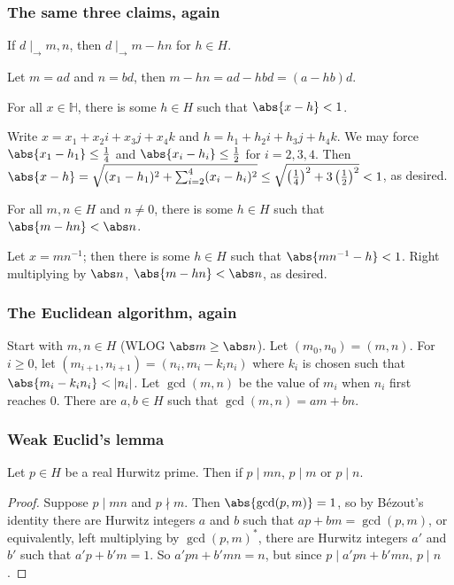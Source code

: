 \documentclass{beamer}
\newcommand{\HH}{\mathbb H}
\newcommand{\rdiv}{\mid_\rightarrow}
\begin{document}
\begin{frame}
	\frametitle{The same three claims, again}
	\begin{block}{}
		If $d \rdiv m,n$, then $d \rdiv m - hn$ for $h \in H$.
	\end{block}
	Let $m = ad$ and $n = bd$, then $m - hn = ad - hbd = (a - hb)d$.

	\begin{block}{}
		For all $x \in \HH$, there is some $h \in H$ such that $\abs{x - h} < 1$.
	\end{block}
	Write $x = x_1 + x_2i + x_3j + x_4k$ and $h = h_1 + h_2i + h_3j + h_4k$. We may force $\abs{x_1 - h_1} \le \frac14$ and $\abs{x_i - h_i} \le \frac12$ for $i = 2,3,4$. Then $\abs{x - h} = \sqrt{(x_1 - h_1)^2 + \sum_{i = 2}^4(x_i - h_i)^2} \le \sqrt{\left(\frac14\right)^2 + 3\left(\frac12\right)^2} < 1$, as desired.
	
	\begin{block}{}
		For all $m,n \in H$ and $n \neq 0$, there is some $h \in H$ such that $\abs{m - hn} < \abs n$.
	\end{block}
	Let $x = mn^{-1}$; then there is some $h \in H$ such that $\abs{mn^{-1} - h} < 1$. Right multiplying by $\abs n$, $\abs{m - hn} < \abs n$, as desired.
\end{frame}

\begin{frame}
	\frametitle{The Euclidean algorithm, again}
	\begin{itemize}
		\ii Start with $m,n \in H$ (WLOG $\abs m \ge \abs n$).
		\ii Let $(m_0,n_0) = (m,n)$.
		\ii For $i \ge 0$, let $(m_{i + 1},n_{i + 1}) = (n_i,m_i - k_in_i)$ where $k_i$ is chosen such that $\abs{m_i - k_in_i} < \lvert n_i\rvert$.
		\ii Let $\gcd(m,n)$ be the value of $m_i$ when $n_i$ first reaches $0$.
		\ii There are $a,b \in H$ such that $\gcd(m,n) = am + bn$.
	\end{itemize}
\end{frame}

\begin{frame}
	\frametitle{Weak Euclid's lemma}
	\begin{lemma}
		Let $p \in H$ be a real Hurwitz prime. Then if $p \mid mn$, $p \mid m$ or $p \mid n$.
	\end{lemma}

	\begin{proof}
		Suppose $p \mid mn$ and $p \nmid m$. Then $\abs{\gcd(p,m)} = 1$, so by B\'ezout's identity there are Hurwitz integers $a$ and $b$ such that $ap + bm = \gcd(p,m)$, or equivalently, left multiplying by $\gcd(p,m)^*$, there are Hurwitz integers $a'$ and $b'$ such that $a'p + b'm = 1$. So $a'pn + b'mn = n$, but since $p \mid a'pn + b'mn$, $p \mid n$.
	\end{proof}
\end{frame}
\end{document}
